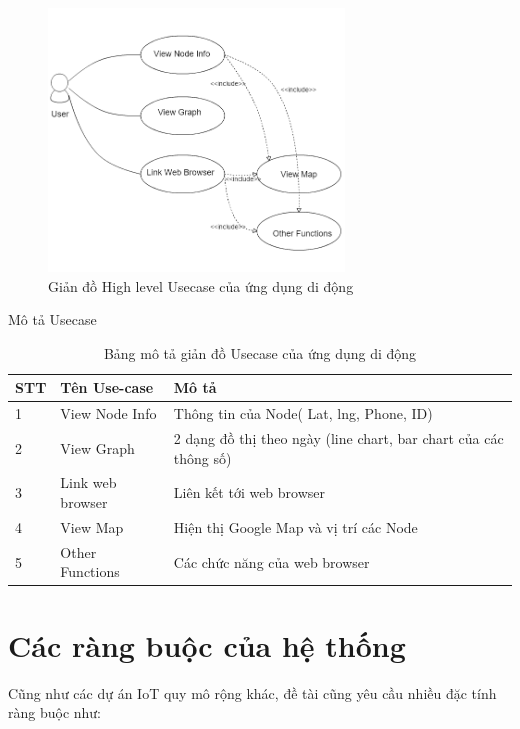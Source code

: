 \begin{figure}[H]
\centering    
\includegraphics[width=0.7\textwidth]{app_usecase}
\caption[Giản đồ High level Usecase của ứng dụng di động]{Giản đồ High level Usecase của ứng dụng di động}
\label{fig:app_usecase}
\end{figure}

Mô tả Usecase

\begin{table}[H]
\centering
\caption{Bảng mô tả giản đồ Usecase của ứng dụng di động}
\label{table:usecase_mobile}
\begin{tabular}{|l|l|l|}
\hline
STT & Tên Use-case     & Mô tả                                                            \\ \hline
1   & View Node Info   & Thông tin của Node( Lat, lng, Phone, ID)                         \\ \hline
2   & View Graph       & 2 dạng đồ thị theo ngày (line chart, bar chart của các thông số) \\ \hline
3   & Link web browser & Liên kết tới web browser                                         \\ \hline
4   & View Map         & Hiện thị Google Map và vị trí các Node                           \\ \hline
5   & Other Functions  & Các chức năng của web browser                                    \\ \hline
\end{tabular}
\end{table}







\section{Các ràng buộc của hệ thống}
Cũng như các dự án IoT quy mô rộng khác, đề tài cũng yêu cầu nhiều đặc tính ràng buộc như:  
